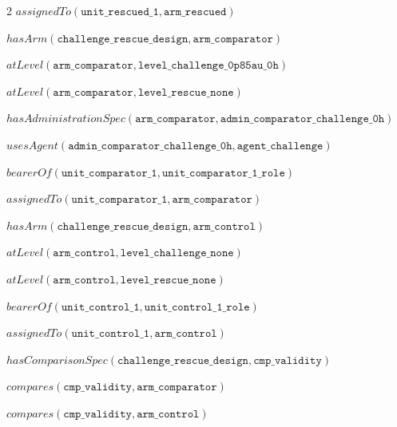 \documentclass[10pt,a4paper]{article}
\begin{document}
{\begin{multicols}{2}
$\mathit{assignedTo}(\mathtt{unit\_\allowbreak{}rescued\_\allowbreak{}1}, \mathtt{arm\_\allowbreak{}rescued})$\par
$\mathit{hasArm}(\mathtt{challenge\_\allowbreak{}rescue\_\allowbreak{}design}, \mathtt{arm\_\allowbreak{}comparator})$\par
$\mathit{atLevel}(\mathtt{arm\_\allowbreak{}comparator}, \mathtt{level\_\allowbreak{}challenge\_\allowbreak{}0p85au\_\allowbreak{}0h})$\par
$\mathit{atLevel}(\mathtt{arm\_\allowbreak{}comparator}, \mathtt{level\_\allowbreak{}rescue\_\allowbreak{}none})$\par
$\mathit{hasAdministrationSpec}(\mathtt{arm\_\allowbreak{}comparator}, \mathtt{admin\_\allowbreak{}comparator\_\allowbreak{}challenge\_\allowbreak{}0h})$\par
$\mathit{usesAgent}(\mathtt{admin\_\allowbreak{}comparator\_\allowbreak{}challenge\_\allowbreak{}0h}, \mathtt{agent\_\allowbreak{}challenge})$\par
$\mathit{bearerOf}(\mathtt{unit\_\allowbreak{}comparator\_\allowbreak{}1}, \mathtt{unit\_\allowbreak{}comparator\_\allowbreak{}1\_\allowbreak{}role})$\par
$\mathit{assignedTo}(\mathtt{unit\_\allowbreak{}comparator\_\allowbreak{}1}, \mathtt{arm\_\allowbreak{}comparator})$\par
$\mathit{hasArm}(\mathtt{challenge\_\allowbreak{}rescue\_\allowbreak{}design}, \mathtt{arm\_\allowbreak{}control})$\par
$\mathit{atLevel}(\mathtt{arm\_\allowbreak{}control}, \mathtt{level\_\allowbreak{}challenge\_\allowbreak{}none})$\par
$\mathit{atLevel}(\mathtt{arm\_\allowbreak{}control}, \mathtt{level\_\allowbreak{}rescue\_\allowbreak{}none})$\par
$\mathit{bearerOf}(\mathtt{unit\_\allowbreak{}control\_\allowbreak{}1}, \mathtt{unit\_\allowbreak{}control\_\allowbreak{}1\_\allowbreak{}role})$\par
$\mathit{assignedTo}(\mathtt{unit\_\allowbreak{}control\_\allowbreak{}1}, \mathtt{arm\_\allowbreak{}control})$\par
$\mathit{hasComparisonSpec}(\mathtt{challenge\_\allowbreak{}rescue\_\allowbreak{}design}, \mathtt{cmp\_\allowbreak{}validity})$\par
$\mathit{compares}(\mathtt{cmp\_\allowbreak{}validity}, \mathtt{arm\_\allowbreak{}comparator})$\par
$\mathit{compares}(\mathtt{cmp\_\allowbreak{}validity}, \mathtt{arm\_\allowbreak{}control})$\par

\end{multicols}}
\end{document}
